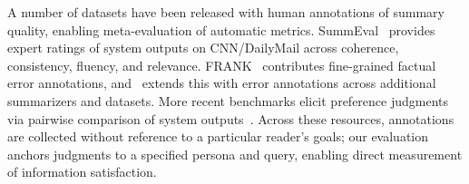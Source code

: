 A number of datasets have been released with human annotations of summary quality, enabling meta-evaluation of automatic metrics. SummEval~\cite{fabbri2021summeval} provides expert ratings of system outputs on CNN/DailyMail across coherence, consistency, fluency, and relevance. FRANK~\cite{pagnoni2021frank} contributes fine-grained factual error annotations, and~\textcite{tang2022understanding} extends this with error annotations across additional summarizers and datasets. More recent benchmarks elicit preference judgments via pairwise comparison of system outputs~\cite{goyal2022news,liu2023benchmarking}. Across these resources, annotations are collected without reference to a particular reader's goals; our evaluation anchors judgments to a specified persona and query, enabling direct measurement of information satisfaction.
